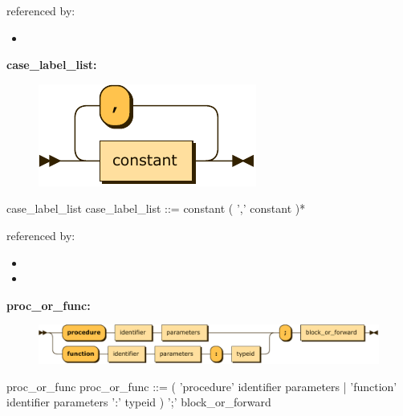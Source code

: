 \documentclass[10pt,a4paper,twoside]{article}
\providecommand{\tightlist}{%
  \setlength{\itemsep}{0pt}\setlength{\parskip}{0pt}}
\newcounter{grammarbox}[section]
\begin{document}
referenced by:

\begin{itemize}
\tightlist
\item
\end{itemize}

\textbf{case\_label\_list:}

\begin{figure}[H]
\centering
\includegraphics{diagram/case_label_list.pdf}

\end{figure}

\begin{grammarbox}{case\_label\_list}
\vspace{0.5em}
case\_label\_list
         ::= constant ( ',' constant )*
\end{grammarbox}

referenced by:

\begin{itemize}
\tightlist
\item
\item
\end{itemize}

\textbf{proc\_or\_func:}

\begin{figure}[H]
\centering
  \includegraphics[width=1\textwidth]{diagram/proc_or_func.pdf}

\end{figure}

\begin{grammarbox}{proc\_or\_func}
\vspace{0.5em}
proc\_or\_func
         ::= ( 'procedure' identifier parameters | 'function' identifier parameters ':' typeid ) ';' block\_or\_forward
\end{grammarbox}
\end{document}
